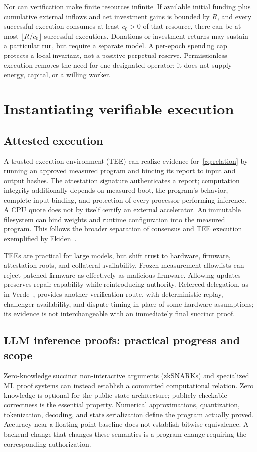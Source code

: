 \documentclass[10pt,letterpaper]{article}
\begin{document}
Nor can verification make finite resources infinite. If available initial funding plus cumulative external inflows and net investment gains is bounded by $R$, and every successful execution consumes at least $c_0>0$ of that resource, there can be at most $\lfloor R/c_0\rfloor$ successful executions. Donations or investment returns may sustain a particular run, but require a separate model. A per-epoch spending cap protects a local invariant, not a positive perpetual reserve. Permissionless execution removes the need for one designated operator; it does not supply energy, capital, or a willing worker.

\section{Instantiating verifiable execution}
\label{sec:backends}
\subsection{Attested execution}
A trusted execution environment (TEE) can realize evidence for~\eqref{eq:relation} by running an approved measured program and binding its report to input and output hashes. The attestation signature authenticates a report; computation integrity additionally depends on measured boot, the program's behavior, complete input binding, and protection of every processor performing inference. A CPU quote does not by itself certify an external accelerator. An immutable filesystem can bind weights and runtime configuration into the measured program. This follows the broader separation of consensus and TEE execution exemplified by Ekiden~\citep{ekiden2019}.

TEEs are practical for large models, but shift trust to hardware, firmware, attestation roots, and collateral availability. Frozen measurement allowlists can reject patched firmware as effectively as malicious firmware. Allowing updates preserves repair capability while reintroducing authority. Refereed delegation, as in Verde~\citep{verde2025}, provides another verification route, with deterministic replay, challenger availability, and dispute timing in place of some hardware assumptions; its evidence is not interchangeable with an immediately final succinct proof.

\subsection{LLM inference proofs: practical progress and scope}
\label{sec:zk}
Zero-knowledge succinct non-interactive arguments (zkSNARKs) and specialized ML proof systems can instead establish a committed computational relation. Zero knowledge is optional for the public-state architecture; publicly checkable correctness is the essential property. Numerical approximations, quantization, tokenization, decoding, and state serialization define the program actually proved. Accuracy near a floating-point baseline does not establish bitwise equivalence. A backend change that changes these semantics is a program change requiring the corresponding authorization.
\end{document}
